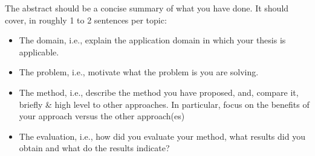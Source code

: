 The abstract should be a concise summary of what you have done.
It should cover, in roughly 1 to 2 sentences per topic:
\begin{itemize}
	\item The domain, i.e., explain the application domain in which your thesis is applicable.
	\item The problem, i.e., motivate what the problem is you are solving.
	\item The method, i.e., describe the method you have proposed, and, compare it, briefly \& high level to other approaches. In particular, focus on the benefits of your approach versus the other approach(es)
	\item The evaluation, i.e., how did you evaluate your method, what results did you obtain  and what do the results indicate?
\end{itemize}